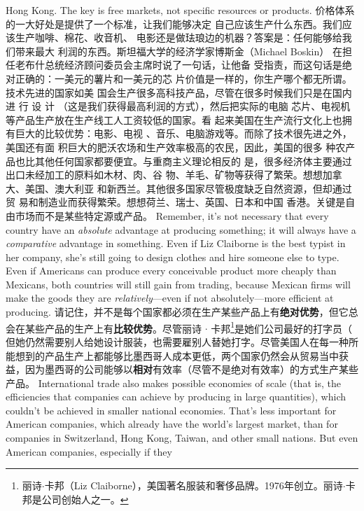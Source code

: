 \begin{paracol}{2}
Hong Kong. The key is free markets, not specific resources or
products.
\switchcolumn
价格体系的一大好处是提供了一个标准，让我们能够决定
自己应该生产什么东西。我们应该生产咖啡、棉花、收音机、
电影还是做珐琅边的机器？答案是：任何能够给我们带来最大
利润的东西。斯坦福大学的经济学家博斯金（Michael Boskin）
在担任老布什总统经济顾问委员会主席时说了一句话，让他备
受指责，而这句话是绝对正确的：一美元的薯片和一美元的芯
片价值是一样的，你生产哪个都无所谓。技术先进的国家如美
国会生产很多高科技产品，尽管在很多时候我们只是在国内进
行 设 计 （这是我们获得最高利润的方式），然后把实际的电脑
芯片、电视机等产品生产放在生产线工人工资较低的国家。看
起来美国在生产流行文化上也拥有巨大的比较优势：电影、电视 、音乐、电脑游戏等。而除了技术很先进之外，美国还有面
积巨大的肥沃农场和生产效率极高的农民，因此，美国的很多
种农产品也比其他任何国家都要便宜。与重商主义理论相反的
是，很多经济体主要通过出口未经加工的原料如木材、肉、谷
物、羊毛、矿物等获得了繁荣。想想加拿大、美国、澳大利亚
和新西兰。其他很多国家尽管极度缺乏自然资源，但却通过贸
易和制造业而获得繁荣。想想荷兰、瑞士、英国、日本和中国
香港。关键是自由市场而不是某些特定源或产品。
\switchcolumn*
Remember, it's not necessary that every country have an \textit{absolute} advantage at producing something; it will always have a
\textit{comparative} advantage in something. Even if Liz Claiborne is the
best typist in her company, she's still going to design clothes
and hire someone else to type. Even if Americans can produce
every conceivable product more cheaply than Mexicans, both
countries will still gain from trading, because Mexican firms will make the goods they are \textit{relatively}---even if not absolutely---more efficient at producing.
\switchcolumn
请记住，并不是每个国家都必须在生产某些产品上有\textbf{绝对优势}，但它总会在某些产品的生产上有\textbf{比较优势}。尽管丽诗 $\cdot$ 卡邦\footnote{丽诗$\cdot$卡邦（Liz  Claiborne），美国著名服装和奢侈品牌。1976年创立。丽诗$\cdot$卡邦是公司创始人之一。}是她们公司最好的打字员（ 但她仍然需要别人给她设计服装，也需要雇别人替她打字。尽管美国人在每一种所能想到的产品生产上都能够比墨西哥人成本更低，两个国家仍然会从贸易当中获益，因为墨西哥的公司能够以\textbf{相对}有效率（尽管不是绝对有效率）的方式生产某些产品。
\switchcolumn*
International trade also makes possible economies of scale
(that is, the efficiencies that companies can achieve by producing in large quantities), which couldn't be achieved in smaller
national economies. That's less important for American companies, which already have the world's largest market, than for
companies in Switzerland, Hong Kong, Taiwan, and other
small nations. But even American companies, especially if they

\end{paracol}
